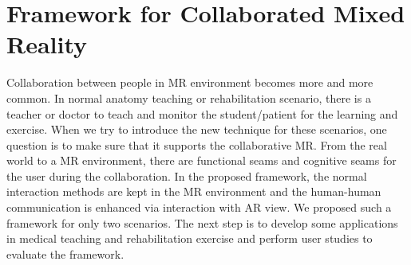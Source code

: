 \section{Framework for Collaborated Mixed Reality}
Collaboration between people in MR environment becomes more and more common. In normal anatomy teaching or rehabilitation scenario, there is a teacher or doctor to teach and monitor the student/patient for the learning and exercise.
When we try to introduce the new technique for these scenarios, one question is to make sure that it supports the collaborative MR. 
From the real world to a MR environment, there are functional seams and cognitive seams for the user during the collaboration. 
In the proposed framework, the normal interaction methods are kept in the MR environment and the human-human communication is enhanced via interaction with AR view.
We proposed such a framework for only two scenarios. 
The next step is to develop some applications in medical teaching and rehabilitation exercise and perform user studies to evaluate the framework. 

